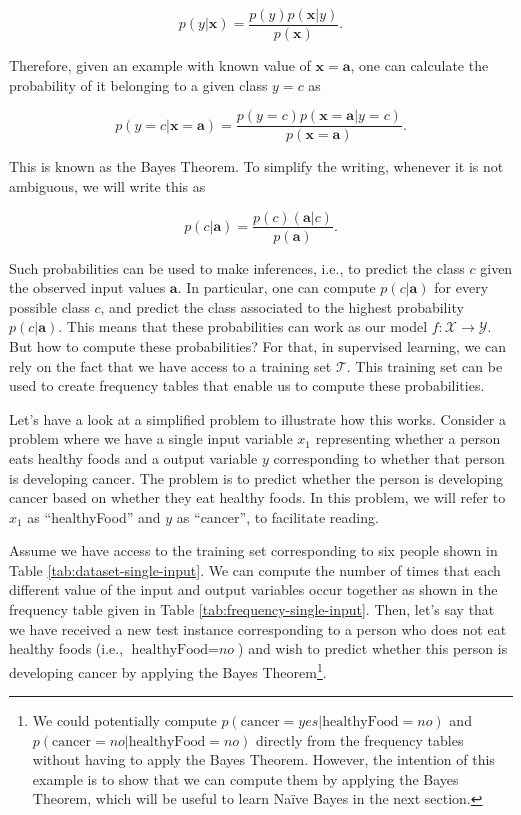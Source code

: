 \[p(y|\mathbf{x}) = \frac{p(y) p(\mathbf{x}|y)}{p(\mathbf{x})}.\]

Therefore, given an example with known value of $\mathbf{x}=\mathbf{a}$, one can calculate the probability of it belonging to a given class $y = c$ as

\begin{equation}p(y=c|\mathbf{x}=\mathbf{a}) = \frac{p(y=c) p(\mathbf{x}=\mathbf{a}|y=c)}{p(\mathbf{x}=\mathbf{a})}. \label{eq:bayes-theorem} \end{equation}

\noindent This is known as the Bayes Theorem. To simplify the writing, whenever it is not ambiguous, we will write this as

\[p(c|\mathbf{a}) = \frac{p(c) (\mathbf{a}|c)}{p(\mathbf{a})}.\]

Such probabilities can be used to make inferences, i.e., to predict the class $c$ given the observed input values $\mathbf{a}$. In particular, one can compute $p(c|\mathbf{a})$ for every possible class $c$, and predict the class associated to the highest probability $p(c|\mathbf{a})$. This means that these probabilities can work as our model $f: \mathcal{X} \rightarrow \mathcal{Y}$. 
But how to compute these probabilities?
For that, in supervised learning, we can rely on the fact that we have access to a training set $\mathcal{T}$. This training set can be used to create frequency tables that enable us to compute these probabilities. 

Let's have a look at a simplified problem to illustrate how this works. Consider a problem where we have a single input variable $x_1$ representing whether a person eats healthy foods and a output variable $y$ corresponding to whether that person is developing cancer. The problem is to predict whether the person is developing cancer based on whether they eat healthy foods. In this problem, we will refer to $x_1$ as ``healthyFood'' and $y$ as ``cancer'', to facilitate reading. 

Assume we have access to the training set corresponding to six people shown in Table \ref{tab:dataset-single-input}. We can compute the number of times that each different value of the input and output variables occur together as shown in the frequency table given in Table \ref{tab:frequency-single-input}. Then, let's say that we have received a new test instance corresponding to a person who does not eat healthy foods (i.e., $\text{healthyFood} = \textit{no}$) and wish to predict whether this person is developing cancer by applying the Bayes Theorem\footnote{We could potentially compute $p(\text{cancer}=\textit{yes}|\text{healthyFood} = \textit{no})$ and $p(\text{cancer}=\textit{no}|\text{healthyFood} = \textit{no})$ directly from the frequency tables without having to apply the Bayes Theorem. However, the intention of this example is to show that we can compute them by applying the Bayes Theorem, which will be useful to learn Na\"{i}ve Bayes in the next section.}. 

